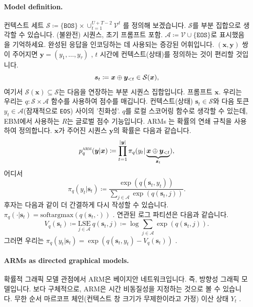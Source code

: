 \documentclass{article}
\def\s{{\bm{s}}}
\def\x{{\bm{x}}}
\def\y{{\bm{y}}}
\def\cA{{\mathcal{A}}}
\def\cS{{\mathcal{S}}}
\def\cV{{\mathcal{V}}}
\def\arm{{\textsc{arm}}}
\def\lse{{\mathrm{LSE}}}
\def\bos{\texttt{BOS}\xspace}
\def\eos{\texttt{EOS}\xspace}
\def\voc{\cV}
\def\augvoc{\cA}
\begin{document}
\paragraph{Model definition.}

컨텍스트 세트 $\cS \coloneqq \{\bos\} \times
\cup_{t=1}^{U+T-2} \voc^t$ 를 정의해 보겠습니다.  $\cS$를 부분 집합으로 생각할 수 있습니다.
(불완전) 시퀀스, 초기 프롬프트 포함.  
$\augvoc \coloneqq \voc \cup \{\eos\}$로 표시했음을 기억하세요. 
완성된 응답을 인코딩하는 데 사용되는 증강된 어휘입니다.  
$(\x, \y)$ 쌍이 주어지면 $\y = (y_1, \dots, y_\tau)$ ,
$t$ 시간에 컨텍스트(상태)를 정의하는 것이 편리할 것입니다.
 \begin{equation} 
 \s _t \coloneqq 
     \x \oplus \y _{<t} \\
  \in \cS ( \x ),
 \label{eq:state_notation} 
 \end{equation} 
여기서 $\cS(\x) \subseteq \cS$는 다음을 연장하는 부분 시퀀스 집합입니다.
프롬프트 $\x$.
우리는
우리는 $q \colon \cS \times \augvoc$ 함수를 사용하여 점수를 매깁니다.
컨텍스트(상태) $\s_t \in \cS$와 다음 토큰 $y_t \in
\augvoc$(잠재적으로 \eos) 사이의 '친화성'.  $q$를 로컬 스코어링 함수로 생각할 수 있는데,
EBM에서 사용하는 $R$는 글로벌 점수 기능입니다.
ARMs \citep{bengio2003neural}는 확률의 연쇄 규칙을 사용하여 정의합니다.
$\x$가 주어진 시퀀스 $\y$의 확률은 다음과 같습니다.
 \begin{equation} 
p^ \arm _q( \y | \x ) \coloneqq 
 \prod _{t=1}^{| \y |} \pi _q(y_t| \underbrace { \x \oplus \y _{<t}}_{ \s _t}),
 \end{equation} 
어디서
 \begin{equation} 
 \pi _q(y_t| \s _t) \coloneqq  
 \frac{\exp(q(\s_t, y_t))} { \sum _{j \in \augvoc } \exp (q( \s _t, j))}.
 \end{equation} 
후자는 다음과 같이 더 간결하게 다시 작성할 수 있습니다.
 $\pi_q(\cdot|\s_t) = \mathrm{softargmax}(q(\s_t, \cdot))$ .
연관된 로그 파티션은 다음과 같습니다.
 \begin{equation} 
V_q( \s _t)
 \coloneqq \underset{j \in \augvoc} { \lse } ~ q( \s _t, j)
 \coloneqq \log \sum _{j \in \augvoc } \exp (q( \s _t, j)).
 \end{equation} 
그러면 우리는
 $\pi_q(y_t|\s_t) = \exp(q(\s_t, y_t) - V_q(\s_t))$ .

\paragraph{ARMs as directed graphical models.}

확률적 그래픽 모델 관점에서 ARM은 베이지안 네트워크입니다. 
즉, 방향성 그래픽 모델입니다.
보다 구체적으로, ARM은 시간 비동질성을 지정하는 것으로 볼 수 있습니다.
무한 순서 마르코프 체인(컨텍스트 창 크기가 무제한이라고 가정)
이산 상태 $Y_t$ .
\end{document}
